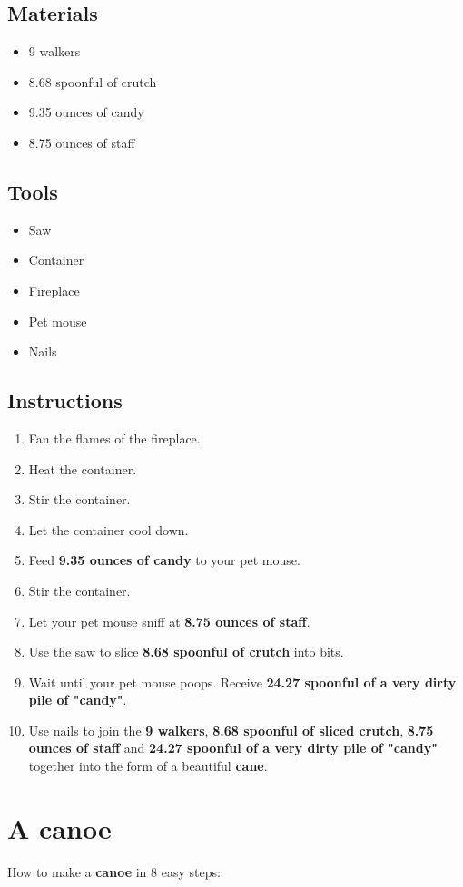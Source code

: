 \documentclass{article}
\begin{document}
\subsection{Materials}\begin{itemize}
\item 
9 walkers
\item 
8.68 spoonful of crutch
\item 
9.35 ounces of candy
\item 
8.75 ounces of staff
\end{itemize}
\subsection{Tools}\begin{itemize}
\item 
Saw
\item 
Container
\item 
Fireplace
\item 
Pet mouse
\item 
Nails
\end{itemize}
\subsection{Instructions}\begin{enumerate}
\item 
Fan the flames of the fireplace.
\item 
Heat the container.
\item 
Stir the container.
\item 
Let the container cool down.
\item 
Feed \textbf{9.35 ounces of candy} to your pet mouse.
\item 
Stir the container.
\item 
Let your pet mouse sniff at \textbf{8.75 ounces of staff}.
\item 
Use the saw to slice \textbf{8.68 spoonful of crutch} into bits.
\item 
Wait until your pet mouse poops. Receive \textbf{24.27 spoonful of a very dirty pile of "candy"}.
\item 
Use nails to join the \textbf{9 walkers}, \textbf{8.68 spoonful of sliced crutch}, \textbf{8.75 ounces of staff} and \textbf{24.27 spoonful of a very dirty pile of "candy"} together into the form of a beautiful \textbf{cane}.
\end{enumerate}
\newpage
\section{A canoe}How to make a \textbf{canoe} in 8 easy steps:
\end{document}
